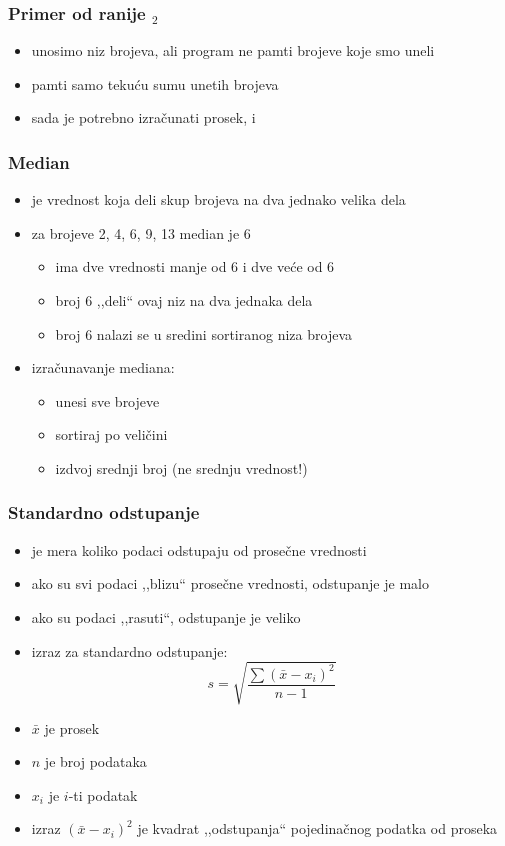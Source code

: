 \documentclass[utf8,compress,aspectratio=169]{beamer}
\begin{document}
\begin{frame}[fragile]
  \frametitle{Primer od ranije $_2$}
  \begin{itemize}
    \item unosimo niz brojeva, ali program ne pamti  brojeve koje smo uneli
    \item pamti samo tekuću sumu unetih brojeva
    \item sada je potrebno izračunati prosek,  i 
  \end{itemize}
\end{frame}

\begin{frame}[fragile]
  \frametitle{Median}
  \begin{itemize}
    \item {} je vrednost koja deli skup brojeva na dva jednako velika dela
    \item za brojeve 2, 4, 6, 9, 13 median je 6
    \begin{itemize}
      \item ima dve vrednosti manje od 6 i dve veće od 6
      \item broj 6 ,,deli`` ovaj niz na dva jednaka dela
      \item broj 6 nalazi se u sredini sortiranog niza brojeva
    \end{itemize}
    \item izračunavanje mediana:
    \begin{itemize}
      \item unesi sve brojeve
      \item sortiraj po veličini
      \item izdvoj srednji broj (ne srednju vrednost!)
    \end{itemize}
  \end{itemize}
\end{frame}

\begin{frame}[fragile]
  \frametitle{Standardno odstupanje}
  \begin{itemize}
    \item {} je mera koliko podaci odstupaju od prosečne vrednosti
    \item ako su svi podaci ,,blizu`` prosečne vrednosti, odstupanje je malo
    \item ako su podaci ,,rasuti``, odstupanje je veliko
    \item izraz za standardno odstupanje: \\
    $$ s = \sqrt{\frac{\sum{(\bar{x}-x_i)^2}}{n-1}} $$
    \item $\bar{x}$ je prosek
    \item $n$ je broj podataka
    \item $x_i$ je $i$-ti podatak
    \item izraz $(\bar{x} - x_i)^2$ je kvadrat ,,odstupanja`` pojedinačnog podatka od proseka
  \end{itemize}
\end{frame}
\end{document}
